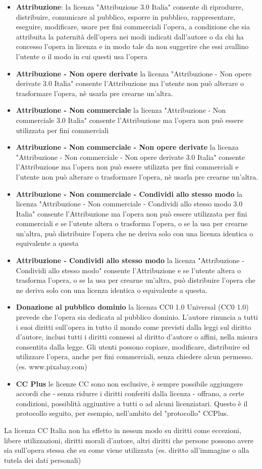 \begin{itemize}
    \item \textbf{Attribuzione}: la licenza "Attribuzione 3.0 Italia" consente di riprodurre, distribuire, comunicare al pubblico,
    esporre in pubblico, rappresentare, eseguire, modificare, usare per fini commerciali l'opera, a condizione che sia
    attribuita la paternità dell'opera nei modi indicati dall'autore o da chi ha concesso l'opera in licenza e in modo tale da non suggerire che essi avallino l'utente
    o il modo in cui questi usa l'opera
    \item \textbf{Attribuzione - Non opere derivate} la licenza "Attribuzione - Non opere derivate 3.0 Italia" consente l'Attribuzione ma l'utente non
    può alterare o trasformare l'opera, nè usarla pre crearne un'altra.
    \item \textbf{Attribuzione - Non commerciale} la licenza "Attribuzione - Non commerciale 3.0 Italia" consente l'Attribuzione ma l'opera non può essere utilizzata
    per fini commerciali
    \item \textbf{Attribuzione - Non commerciale - Non opere derivate} la licenza "Attribuzione - Non commerciale - Non opere derivate 3.0 Italia" consente l'Attribuzione ma l'opera non
    può essere utilizzta per fini commerciali e l'utente non può alterare o trasformare l'opera, nè usarla pre crearne un'altra.
    \item \textbf{Attribuzione - Non commerciale - Condividi allo stesso modo} la licenza "Attribuzione - Non commerciale - Condividi allo stesso modo 3.0 Italia" consente l'Attribuzione ma
    l'opera non può essere utilizzata per fini commerciali e se l'utente altera o trasforma l'opera, o se la usa per crearne un'altra, può distribuire l'opera
    che ne deriva solo con una licenza identica o equivalente a questa
    \item \textbf{Attribuzione - Condividi allo stesso modo} la licenza "Attribuzione - Condividi allo stesso modo" consente l'Attribuzione e se l'utente altera o trasforma l'opera, o se la
    usa per crearne un'altra, può distribuire l'opera che ne deriva solo con una licenza identica o equivalente a questa.
    \item \textbf{Donazione al pubblico dominio} la licenza CC0 1.0 Universal (CC0 1.0) prevede che l'opera sia dedicata al pubblico dominio. \newline
    L'autore rinuncia a tutti i suoi diritti sull'opera in tutto il mondo come previsti dalla leggi sul diritto d'autore, inclusi tutti i diritti connessi
    al diritto d'autore o affini, nella misura consentita dalla legge.\newline
    Gli utenti possono copiare, modificare, distribuire ed utilizzare l'opera, anche per fini commerciali, senza chiedere
    alcun permesso. (es. www.pixabay.com)
    \item \textbf{CC Plus} le licenze CC sono non esclusive, è sempre possibile aggiungere accordi che - senza ridurre i diritti conferiti dalla licenza - offrano, a certe
    condizioni, possiblità aggiuntive a tutti o ad alcuni licenziatari. Questo è il protocollo seguito, per esempio, nell'ambito del "protocollo" CCPlus.
\end{itemize}
La licenza CC Italia non ha effetto in nessun modo su diritti come eccezioni,
libere utilizzazioni, diritti morali d'autore, altri diritti che persone
possono avere sia sull'opera stessa
che su come viene utilizzata (es. diritto all'immagine o alla tutela dei dati personali)

